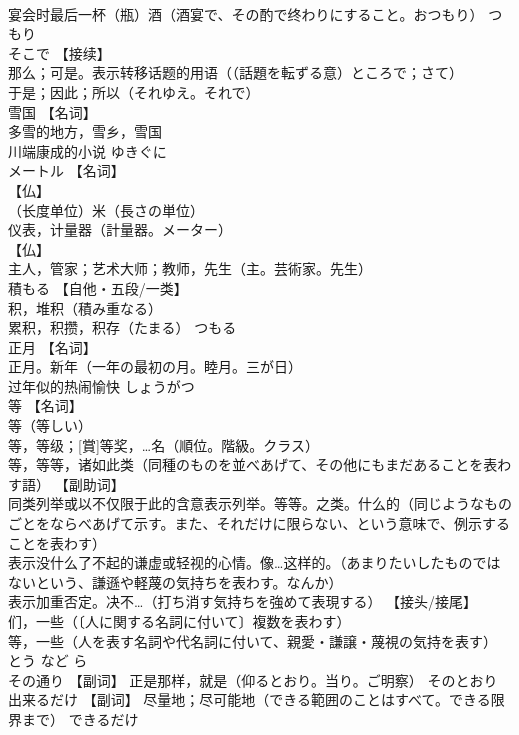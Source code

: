 \documentclass[8pt]{extreport}
\begin{document}
\begin{CJK}{UTF8}{min}
\\	宴会时最后一杯（瓶）酒（酒宴で、その酌で终わりにすること。おつもり）	つもり	
\\	そこで	【接续】 
\\	那么；可是。表示转移话题的用语（（話題を転ずる意）ところで；さて） 
\\	于是；因此；所以（それゆえ。それで）		
\\	雪国	【名词】 
\\	多雪的地方，雪乡，雪国 
\\	川端康成的小说	ゆきぐに	
\\	メートル	【名词】 
\\	【仏】
\\	（长度单位）米（長さの単位） 
\\	仪表，计量器（計量器。メーター） 
\\	【仏】
\\	主人，管家；艺术大师；教师，先生（主。芸術家。先生）		
\\	積もる	【自他・五段/一类】 
\\	积，堆积（積み重なる） 
\\	累积，积攒，积存（たまる）	つもる	
\\	正月	【名词】 
\\	正月。新年（一年の最初の月。睦月。三が日） 
\\	过年似的热闹愉快	しょうがつ	
\\	等	【名词】 
\\	等（等しい） 
\\	等，等级；[賞]等奖，…名（順位。階級。クラス） 
\\	等，等等，诸如此类（同種のものを並べあげて、その他にもまだあることを表わす語） 【副助词】 
\\	同类列举或以不仅限于此的含意表示列举。等等。之类。什么的（同じようなものごとをならべあげて示す。また、それだけに限らない、という意味で、例示することを表わす） 
\\	表示没什么了不起的谦虚或轻视的心情。像…这样的。（あまりたいしたものではないという、謙遜や軽蔑の気持ちを表わす。なんか） 
\\	表示加重否定。决不…（打ち消す気持ちを強めて表現する） 【接头/接尾】 
\\	们，一些（〔人に関する名詞に付いて〕複数を表わす） 
\\	等，一些（人を表す名詞や代名詞に付いて、親愛・謙譲・蔑視の気持を表す）	とう など ら	
\\	その通り	【副词】 正是那样，就是（仰るとおり。当り。ご明察）	そのとおり	
\\	出来るだけ	【副词】 尽量地；尽可能地（できる範囲のことはすべて。できる限界まで）	できるだけ	

\end{CJK}
\end{document}

